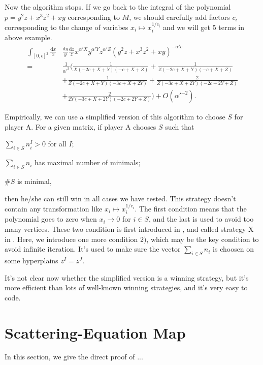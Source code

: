 \documentclass[12pt]{article}
\theoremstyle{definition}
\theoremstyle{plain}
\newcommand{\dif}{\mathrm{d}} %
\begin{document}
Now the algorithm stops. If we go back to the integral of the polynomial $p=y^2z+x^3z^2+xy$
corresponding to $M$, we should carefully add factors $c_i$
corresponding to the change of variabes $x_i\mapsto x_i^{1/c_i}$ and we will get $5$ terms 
in above example.
\begin{align*}
	\int_{[0,\epsilon]^3}\frac{\dif x}{x}&\frac{\dif y}{y}\frac{\dif z}{z}
	x^{\alpha' X}y^{\alpha' Y}z^{\alpha' Z}(y^2z+x^3z^2+xy)^{-\alpha' c}\\
	=\,&\frac{1}{{\alpha'}^3}\biggl(
	\frac{1}{X (-2 c+X+Y) (-c+X+Z)}+\frac{1}{Z (-2 c+X+Y) (-c+X+Z)}\\
	&+\frac{1}{Z (-2 c+X+Y) (-3 c+X+2 Y)}+
	\frac{2}{Z (-3 c+X+2 Y) (-2 c+2 Y+Z)}\\
	&+\frac{2}{2 Y (-3 c+X+2 Y) (-2 c+2 Y+Z)}
	\biggr) +O({\alpha'}^{-2}).
\end{align*}

Empirically, we can use a simplified version of this algorithm to choose $S$ for player A.
For a given matrix, if player A chooses $S$ such that 
\begin{compactenum}[\quad\, 1)]
\item $\sum_{i\in S} n_i^I>0$ for all $I$;
\item $\sum_{i\in S} n_i$ has maximal number of minimals;
\item $\#S$ is minimal,
\end{compactenum}
then he/she can still win in all cases we have tested. 
This strategy doesn't contain any transformation like $x_i\mapsto x_i^{1/c_i}$. The first 
condition means that the polynomial goes to zero when $x_i\to 0$ for $i\in S$, and
the last is used to avoid too many vertices. These two condition is first
introduced in \cite{Binoth:2000ps}, and called strategy X in \cite{bogner2009mathematical}.
Here, we introduce one more condition $2)$, which may be the key condition to avoid 
infinite iteration. It's used to make sure the vector $\sum_{i\in S} n_i$
is choosen on some hyperplains $z^I=z^J$.

It's not clear now whether the simplified version is a winning strategy,
but it's more efficient than lots of well-known winning strategies, and it's 
very easy to code.

\section{Scattering-Equation Map}

In this section, we give the direct proof of ...
\end{document}
